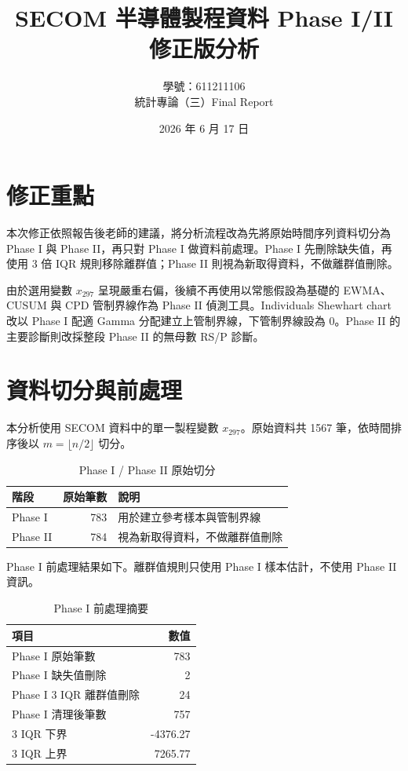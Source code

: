 \documentclass[a4paper,12pt]{report}
\title{\textbf{SECOM 半導體製程資料 Phase I/II 修正版分析}}
\author{學號：611211106\\統計專論（三）Final Report}
\date{2026 年 6 月 17 日}
\begin{document}
\maketitle
\tableofcontents

\chapter{修正重點}

本次修正依照報告後老師的建議，將分析流程改為先將原始時間序列資料切分為 Phase I 與 Phase II，再只對 Phase I 做資料前處理。Phase I 先刪除缺失值，再使用 3 倍 IQR 規則移除離群值；Phase II 則視為新取得資料，不做離群值刪除。

由於選用變數 \(x_{297}\) 呈現嚴重右偏，後續不再使用以常態假設為基礎的 EWMA、CUSUM 與 CPD 管制界線作為 Phase II 偵測工具。Individuals Shewhart chart 改以 Phase I 配適 Gamma 分配建立上管制界線，下管制界線設為 0。Phase II 的主要診斷則改採整段 Phase II 的無母數 RS/P 診斷。

\chapter{資料切分與前處理}

本分析使用 SECOM 資料中的單一製程變數 \(x_{297}\)。原始資料共 1567 筆，依時間排序後以 \(m=\lfloor n/2 \rfloor\) 切分。

\begin{table}[H]
\centering
\caption{Phase I / Phase II 原始切分}
\begin{tabular}{lrl}
\toprule
階段 & 原始筆數 & 說明 \\
\midrule
Phase I & 783 & 用於建立參考樣本與管制界線 \\
Phase II & 784 & 視為新取得資料，不做離群值刪除 \\
\bottomrule
\end{tabular}
\end{table}

Phase I 前處理結果如下。離群值規則只使用 Phase I 樣本估計，不使用 Phase II 資訊。

\begin{table}[H]
\centering
\caption{Phase I 前處理摘要}
\begin{tabular}{lr}
\toprule
項目 & 數值 \\
\midrule
Phase I 原始筆數 & 783 \\
Phase I 缺失值刪除 & 2 \\
Phase I 3 IQR 離群值刪除 & 24 \\
Phase I 清理後筆數 & 757 \\
3 IQR 下界 & -4376.27 \\
3 IQR 上界 & 7265.77 \\
\bottomrule
\end{tabular}
\end{table}
\end{document}

